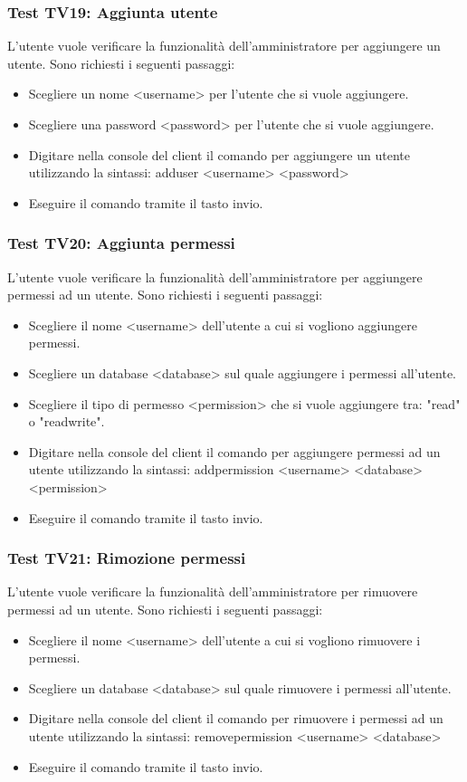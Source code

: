 \documentclass[a4paper]{article}
\begin{document}
		\subsubsection{Test TV19: Aggiunta utente}
		L'utente vuole verificare la funzionalità dell'amministratore per aggiungere un utente.
		Sono richiesti i seguenti passaggi:
		\begin{itemize}
			\item Scegliere un nome <username> per l'utente che si vuole aggiungere.
			\item Scegliere una password <password> per l'utente che si vuole aggiungere.
			\item Digitare nella console del client il comando per aggiungere un utente utilizzando la sintassi: adduser <username>	<password>
			\item Eseguire il comando tramite il tasto invio.
		\end{itemize}
		
		\subsubsection{Test TV20: Aggiunta permessi}
		L'utente vuole verificare la funzionalità dell'amministratore per aggiungere permessi ad un utente.
		Sono richiesti i seguenti passaggi:
		\begin{itemize}
			\item Scegliere il nome <username> dell'utente a cui si vogliono aggiungere permessi.
			\item Scegliere un database <database> sul quale aggiungere i permessi all'utente.
			\item Scegliere il tipo di permesso <permission> che si vuole aggiungere tra: "read" o "readwrite".
			\item Digitare nella console del client il comando per aggiungere permessi ad un utente utilizzando la sintassi: addpermission <username> <database> <permission>
			\item Eseguire il comando tramite il tasto invio.
		\end{itemize}
		
		\subsubsection{Test TV21: Rimozione permessi}
		L'utente vuole verificare la funzionalità dell'amministratore per rimuovere permessi ad un utente.
		Sono richiesti i seguenti passaggi:
		\begin{itemize}
			\item Scegliere il nome <username> dell'utente a cui si vogliono rimuovere i permessi.
			\item Scegliere un database <database> sul quale rimuovere i permessi all'utente.
			\item Digitare nella console del client il comando per rimuovere i permessi ad un utente utilizzando la sintassi: removepermission <username> <database>
			\item Eseguire il comando tramite il tasto invio.
		\end{itemize}
		
\end{document}
